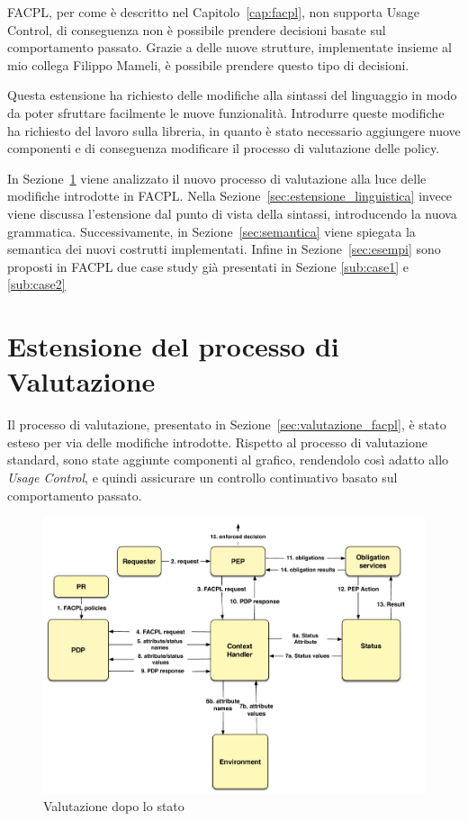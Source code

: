 \label{cap:usagecontrolfacpl}

\ac{FACPL}, per come è descritto nel Capitolo~\ref{cap:facpl}, non supporta Usage Control, di conseguenza non è possibile prendere decisioni basate sul comportamento passato. Grazie a delle nuove strutture, implementate insieme al mio collega Filippo Mameli, è possibile prendere questo tipo di decisioni.

Questa estensione ha richiesto delle modifiche alla sintassi del linguaggio in modo da poter sfruttare facilmente le nuove funzionalità. Introdurre queste modifiche ha richiesto del lavoro sulla libreria, in quanto è stato necessario aggiungere nuove componenti e di conseguenza modificare il processo di valutazione delle policy.

In Sezione~\ref{sec:estensione_del_processo_di_valutazione} viene analizzato il nuovo processo di valutazione alla luce delle modifiche introdotte in \ac{FACPL}.
Nella Sezione~\ref{sec:estensione_linguistica} invece viene discussa l'estensione dal punto di vista della sintassi, introducendo la nuova grammatica.
Successivamente, in Sezione~\ref{sec:semantica} viene spiegata la semantica dei nuovi costrutti implementati. Infine in Sezione~\ref{sec:esempi} sono proposti in \ac{FACPL} due case study già presentati in Sezione \ref{sub:case1} e \ref{sub:case2}

\section{Estensione del processo di Valutazione} %
\label{sec:estensione_del_processo_di_valutazione}
Il processo di valutazione, presentato in Sezione~\ref{sec:valutazione_facpl}, è stato esteso per via delle modifiche introdotte. 
Rispetto al processo di valutazione standard, sono state aggiunte
componenti al grafico, rendendolo così adatto allo \textit{Usage Control}, e quindi assicurare un controllo continuativo basato sul comportamento passato.
\begin{figure}[h]
 \centering 
	\includegraphics[scale = 0.5]{./Chapters/Image/evalvect.pdf}
 \caption{Valutazione dopo lo stato}
 \label{fig:evalStatus}
\end{figure}

